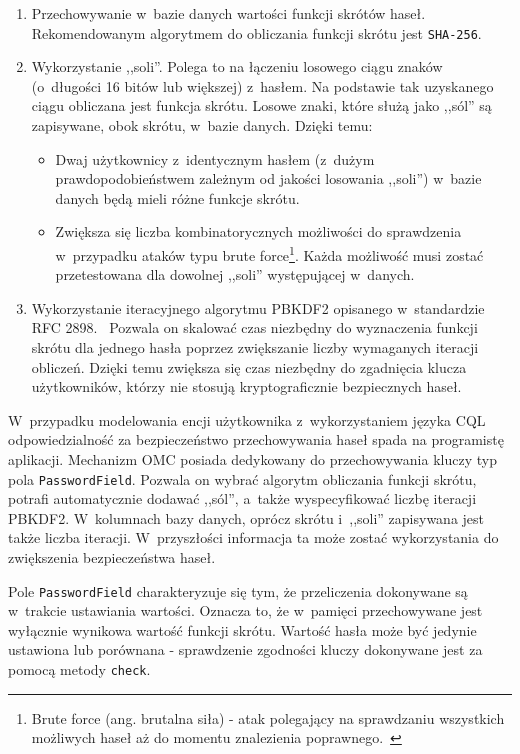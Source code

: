 \begin{enumerate}
	\item Przechowywanie w~bazie danych wartości funkcji skrótów haseł. Rekomendowanym algorytmem do obliczania funkcji skrótu jest \verb+SHA-256+.
	\item Wykorzystanie ,,soli''. Polega to na łączeniu losowego ciągu znaków (o~długości 16 bitów lub większej) z~hasłem. Na podstawie tak uzyskanego ciągu obliczana jest funkcja skrótu. Losowe znaki, które służą jako ,,sól'' są zapisywane, obok skrótu, w~bazie danych. Dzięki temu:
		\begin{itemize}
			\item Dwaj użytkownicy z~identycznym hasłem (z~dużym prawdopodobieństwem zależnym od jakości losowania ,,soli'') w~bazie danych będą mieli różne funkcje skrótu.
			\item Zwiększa się liczba kombinatorycznych możliwości do sprawdzenia w~przypadku ataków typu brute force\footnote{Brute force (ang. brutalna siła) - atak polegający na sprawdzaniu wszystkich możliwych haseł aż do momentu znalezienia poprawnego.~\cite{brute_force_definition}}. Każda możliwość musi zostać przetestowana dla dowolnej ,,soli'' występującej w~danych.
		\end{itemize}
	\item Wykorzystanie iteracyjnego algorytmu PBKDF2 opisanego w~standardzie RFC 2898.~\cite{rfc_2898} Pozwala on skalować czas niezbędny do wyznaczenia funkcji skrótu dla jednego hasła poprzez zwiększanie liczby wymaganych iteracji obliczeń. Dzięki temu zwiększa się czas niezbędny do zgadnięcia klucza użytkowników, którzy nie stosują kryptograficznie bezpiecznych haseł.
\end{enumerate}

W~przypadku modelowania encji użytkownika z~wykorzystaniem języka CQL odpowiedzialność za bezpieczeństwo przechowywania haseł spada na programistę aplikacji. Mechanizm OMC posiada dedykowany do przechowywania kluczy typ pola \verb+PasswordField+. Pozwala on wybrać algorytm obliczania funkcji skrótu, potrafi automatycznie dodawać ,,sól'', a~także wyspecyfikować liczbę iteracji PBKDF2. W~kolumnach bazy danych, oprócz skrótu i~,,soli'' zapisywana jest także liczba iteracji. W~przyszłości informacja ta może zostać wykorzystania do zwiększenia bezpieczeństwa haseł.

Pole \verb+PasswordField+ charakteryzuje się tym, że przeliczenia dokonywane są w~trakcie ustawiania wartości. Oznacza to, że w~pamięci przechowywane jest wyłącznie wynikowa wartość funkcji skrótu. Wartość hasła może być jedynie ustawiona lub porównana - sprawdzenie zgodności kluczy dokonywane jest za pomocą metody \verb+check+.

